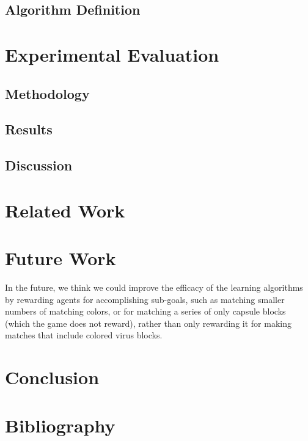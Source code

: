 \documentclass[letterpaper]{article} %
\begin{document}
\subsection{Algorithm Definition}

\section{Experimental Evaluation}
\subsection{Methodology}

\subsection{Results}

\subsection{Discussion}

\section{Related Work}

\section{Future Work}
In the future, we think we could improve the efficacy of the learning algorithms by rewarding agents for accomplishing sub-goals, such as matching smaller numbers of matching colors, or for matching a series of only capsule blocks (which the game does not reward), rather than only rewarding it for making matches that include colored virus blocks.

\section{Conclusion}

\newpage
\section{Bibliography}


\end{document}
